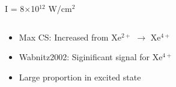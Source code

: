 \documentclass{beamer}
\makeatletter
\newcommand{\framenumber}{
\begin{textblock}{0}(0.01,0.967)
\begin{scriptsize}
{\color{gray}\insertframenumber/\inserttotalframenumber}
\end{scriptsize}
\end{textblock}
}
\makeatother
\begin{document}
\begin{frame}{I = 8$\times$10$^{12}$ W/cm$^2$}
\begin{columns}
\end{columns}
\begin{itemize}
    \item<2-> Max CS: Increased from Xe$^{2+}$ $\rightarrow$ Xe$^{4+}$
    \item<2-> Wabnitz2002: Siginificant signal for Xe$^{4+}$
    \item<2-> Large proportion in excited state
\end{itemize}
\end{frame}

\end{document}
